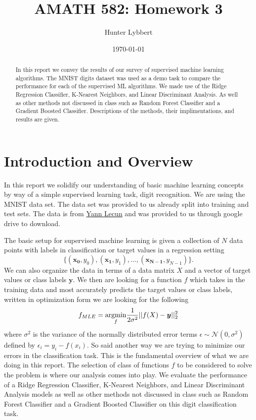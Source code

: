 \documentclass[11pt]{amsart}
\title{AMATH 582: Homework 3}
\author{Hunter Lybbert} %
\date{\today} %
\begin{document}
\maketitle

\begin{abstract}
    In this report we convey the results of our survey of supervised machine learning algorithms.
    The MNIST digits dataset was used as a demo task to compare the performance for each of the supervised ML algorithms. We made use of the Ridge Regression Classifier, K-Nearest Neighbors, and Linear Discriminant Analysis. As well as other methods not discussed in class such as Random Forest Classifier and a Gradient Boosted Classifier. Descriptions of the methods, their implimentations, and results are given.
\end{abstract}

\section{Introduction and Overview}\label{sec:Introduction}
In this report we solidify our understanding of basic machine learning concepts by way of a simple supervised learning task, digit recognition.
We are using the MNIST data set.
The data set was provided to us already split into training and test sets.
The data is from \href{http://yann.lecun.com/}{Yann Lecun} and was provided to us through google drive to download.

The basic setup for supervised machine learning is given a collection of $N$ data points with labels in classification or target values in a regression setting $$\big\{(\bm{x_0}, y_0), (\bm{x_1}, y_1), ..., (\bm{x_{N-1}}, y_{N-1})\big\}.$$
We can also organize the data in terms of a data matrix $X$ and a vector of target values or class labels $\bm y$.
We then are looking for a function $f$ which takes in the training data and most accurately predicts the target values or class labels, written in optimization form we are looking for the following
$$f_{MLE} = \underset{f}{\rm argmin } \frac 1 {2 \sigma^2}|| f(X) - \bm y ||_2^2$$
where $\sigma^2$ is the variance of the normally distributed error terms $\epsilon \sim \mathcal N (0, \sigma^2)$ defined by $\epsilon_i = y_i - f(x_i)$.
So said another way we are trying to minimize our errors in the classification task.
This is the fundamental overview of what we are doing in this report.
The selection of class of functions $f$ to be considered to solve the problem is where our analysis comes into play. We evaluate the performance of a Ridge Regression Classifier, K-Nearest Neighbors, and Linear Discriminant Analysis models as well as other methods not discussed in class such as Random Forest Classifier and a Gradient Boosted Classifier on this digit classification task.
\end{document}
